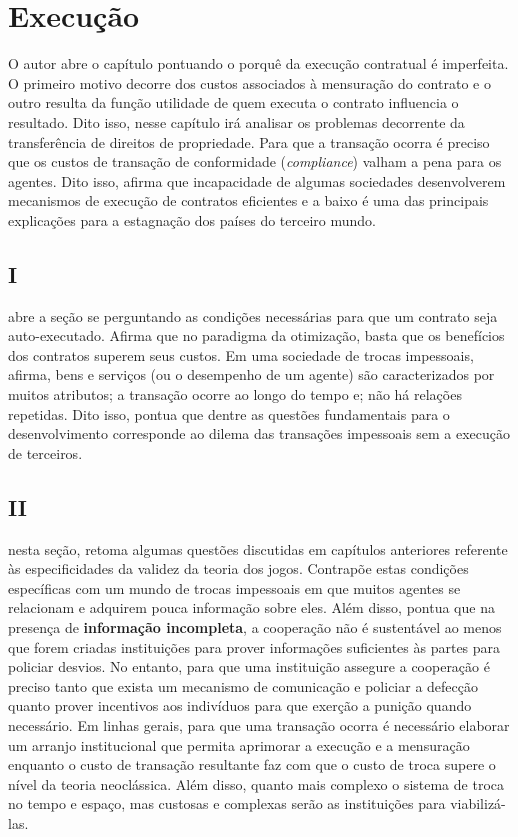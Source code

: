 \section*{Execução}

O autor abre o capítulo pontuando o porquê da execução contratual é imperfeita. O primeiro motivo decorre dos custos associados à mensuração do contrato e o outro resulta da função utilidade de quem executa o contrato influencia o resultado. Dito isso, nesse capítulo irá analisar os problemas decorrente da transferência de direitos de propriedade. Para que a transação ocorra é preciso que os custos de transação de conformidade (\textit{compliance}) valham a pena para os agentes. Dito isso, afirma que incapacidade de algumas sociedades desenvolverem mecanismos de execução de contratos eficientes e a baixo é uma das principais explicações para a estagnação dos países do terceiro mundo.

\subsection*{I}

\autor abre a seção se perguntando as condições necessárias para que um contrato seja auto-executado. Afirma que no paradigma da otimização, basta que os benefícios dos contratos superem seus custos. Em uma sociedade de trocas impessoais, afirma, bens e serviços (ou o desempenho de um agente) são caracterizados por muitos atributos; a transação ocorre ao longo do tempo e; não há relações repetidas. Dito isso, pontua que dentre as questões fundamentais para o desenvolvimento corresponde ao dilema das transações impessoais sem a execução de terceiros.

\subsection*{II}

nesta seção, \autor retoma algumas questões discutidas em capítulos anteriores referente às especificidades da validez da teoria dos jogos. Contrapõe estas condições específicas com um mundo de trocas impessoais em que muitos agentes se relacionam e adquirem pouca informação sobre eles. Além disso, pontua que na presença de \textbf{informação incompleta}, a cooperação não é sustentável ao menos que forem criadas instituições para prover informações suficientes às partes para policiar desvios. No entanto, para que uma instituição assegure a cooperação é preciso tanto que exista um mecanismo de comunicação e policiar a defecção quanto prover incentivos aos indivíduos para que exerção a punição quando necessário. Em linhas gerais, para que uma transação ocorra é necessário elaborar um arranjo institucional que permita aprimorar a execução e a mensuração enquanto o custo de transação resultante faz com que o custo de troca supere o nível da teoria neoclássica. Além disso, quanto mais complexo o sistema de troca no tempo e espaço, mas custosas e complexas serão as instituições para viabilizá-las.

